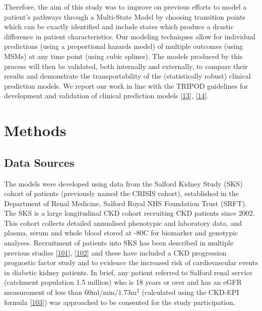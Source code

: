 \documentclass[12pt,PhD,twoside,openright]{muthesis}
\begin{document}
Therefore, the aim of this study was to improve on previous efforts to model a patient's pathways through a Multi-State Model by choosing transition points which can be exactly identified and include states which produce a drastic difference in patient characteristics. Our modeling techniques allow for individual predictions (using a proportional hazards model) of multiple outcomes (using MSMs) at any time point (using cubic splines). The models produced by this process will then be validated, both internally and externally, to compare their results and demonstrate the transportability of the (statistically robust) clinical prediction models. We report our work in line with the TRIPOD guidelines for development and validation of clinical prediction models {[}\protect\hyperlink{ref-collins_transparent_2015}{13}{]}, {[}\protect\hyperlink{ref-moons_transparent_2015}{14}{]}.

\hypertarget{methods-6}{%
\section{Methods}\label{methods-6}}

\hypertarget{data-sources}{%
\subsection{Data Sources}\label{data-sources}}

The models were developed using data from the Salford Kidney Study (SKS) cohort of patients (previously named the CRISIS cohort), established in the Department of Renal Medicine, Salford Royal NHS Foundation Trust (SRFT). The SKS is a large longitudinal CKD cohort recruiting CKD patients since 2002. This cohort collects detailed annualised phenotypic and laboratory data, and plasma, serum and whole blood stored at -80\textdegree C for biomarker and genotypic analyses. Recruitment of patients into SKS has been described in multiple previous studies {[}\protect\hyperlink{ref-hoefield_factors_2010}{101}{]}, {[}\protect\hyperlink{ref-chinnadurai_increased_2019-1}{102}{]} and these have included a CKD progression prognostic factor study and to evidence the increased risk of cardiovascular events in diabetic kidney patients. In brief, any patient referred to Salford renal service (catchment population 1.5 million) who is 18 years or over and has an eGFR measurement of less than \(60\textrm{ml}/\textrm{min}/1.73\textrm{m}^2\) (calculated using the CKD-EPI formula {[}\protect\hyperlink{ref-levey_new_2009}{103}{]}) was approached to be consented for the study participation.
\end{document}
